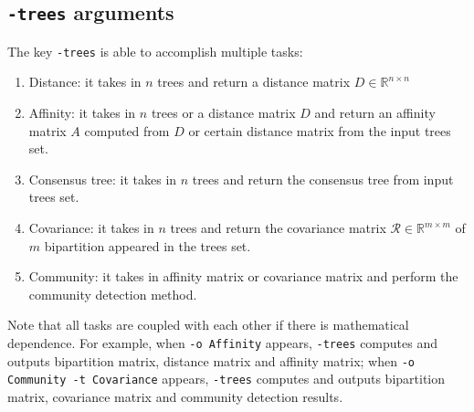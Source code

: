 \documentclass[11pt,a4paper]{article}
\theoremstyle{definition}
\theoremstyle{definition}
\numberwithin{equation}{section}
\begin{document}
	\clearpage
	
	\subsection{\texttt{-trees} arguments}
	
	The key \texttt{-trees} is able to accomplish multiple tasks:
	\begin{enumerate}
		\item Distance: it takes in $n$ trees and return a distance matrix $D\in \mathbb{R}^{n \times n}$
		\item Affinity: it takes in $n$ trees or a distance matrix $D$ and return an affinity matrix $A$ computed from $D$ or certain distance matrix from the input trees set.
		\item Consensus tree: it takes in $n$ trees and return the consensus tree from input trees set.
		\item Covariance: it takes in $n$ trees and return the covariance matrix $\mathcal{R}\in \mathbb{R}^{m\times m}$ of $m$ bipartition appeared in the trees set.
		\item Community: it takes in affinity matrix or covariance matrix and perform the community detection method.
	\end{enumerate}

	Note that all tasks are coupled with each other if there is mathematical dependence. For example, when \texttt{-o Affinity} appears, \texttt{-trees} computes and outputs bipartition matrix, distance matrix and affinity matrix; when \texttt{-o Community -t Covariance} appears, \texttt{-trees} computes and outputs bipartition matrix, covariance matrix and community detection results.
	
\end{document}
